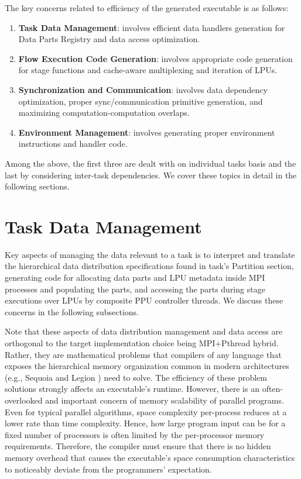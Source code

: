 \documentclass[ASNA,twocolumn]{USG} %
\begin{document}
{The key concerns related to efficiency of the generated executable is as follows:
\begin{enumerate}
	\item \textbf{Task Data Management}: involves efficient data handlers generation for Data Parts Registry and data access optimization.
	\item \textbf{Flow Execution Code Generation}: involves appropriate code generation for stage functions and cache-aware multiplexing and iteration of LPUs.
	\item \textbf{Synchronization and Communication}: involves data dependency optimization, proper sync/communication primitive generation, and maximizing computation-computation overlaps.
	\item \textbf{Environment Management}: involves generating proper environment instructions and handler code.
\end{enumerate}
Among the above, the first three are dealt with on individual tasks basis and the last by considering inter-task dependencies. We cover these topics in detail in the following sections.

\section{Task Data Management}
\label{sec:task-data-mgmt}
Key aspects of managing the data relevant to a task is to interpret and translate the hierarchical data distribution specifications found in task's Partition section, generating code for allocating data parts and LPU metadata inside MPI processes and populating the parts, and accessing the parts during stage executions over LPUs by composite PPU controller threads. We discuss these concerns in the following subsections.

{\color{red} 
Note that these aspects of data distribution management and data access are orthogonal to the target implementation choice being MPI+Pthread hybrid. Rather, they are mathematical problems that compilers of any language that exposes the hierarchical memory organization common in modern architectures (e.g., Sequoia \citep{10.1145/1188455.1188543} and Legion \citep{10.5555/2388996.2389086}) need to solve. The efficiency of these problem solutions strongly affects an executable's runtime. However, there is an often-overlooked and important concern of memory scalability of parallel programs. Even for typical parallel algorithms, space complexity per-process reduces at a lower rate than time complexity. Hence, how large program input can be for a fixed number of processors is often limited by the per-processor memory requirements. Therefore, the compiler must ensure that there is no hidden memory overhead that causes the executable's space consumption characteristics to noticeably deviate from the programmers' expectation.  
}

}
\end{document}
